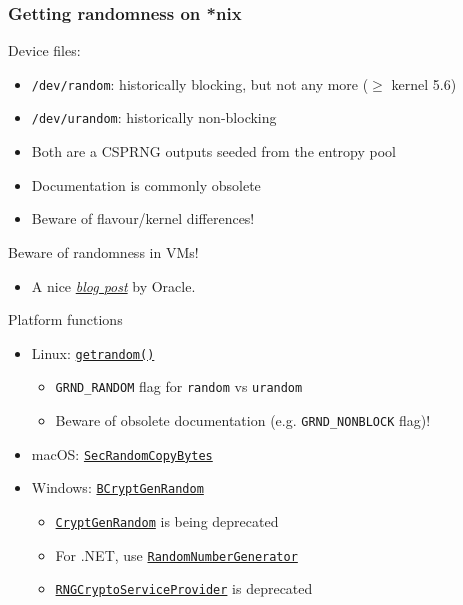 \begin{frame}
  \frametitle{Getting randomness on *nix}

  \pause
  Device files:
  \begin{itemize}
    \item \texttt{/dev/random}: historically blocking, but not any more ($\ge$ kernel 5.6)
    \item \texttt{/dev/urandom}: historically non-blocking
    \pause
    \item Both are a CSPRNG outputs seeded from the entropy pool
    \pause
    \item Documentation is commonly obsolete
    \pause
    \item Beware of flavour/kernel differences!
  \end{itemize}

  \vspace*{1em}
  
  \pause
  Beware of randomness in VMs!
  \begin{itemize}
    \item A nice \href{https://blogs.oracle.com/linux/post/rngd1}{\emph{blog post}} by Oracle.
  \end{itemize}
\end{frame}

\begin{frame}{Platform functions}
  \begin{itemize}[<+(1)->]
    \item Linux: \href{https://man7.org/linux/man-pages/man2/getrandom.2.html}{\texttt{getrandom()}}
    \begin{itemize}
      \item \texttt{GRND\_RANDOM} flag for \texttt{random} vs \texttt{urandom}
      \item Beware of obsolete documentation (e.g. \texttt{GRND\_NONBLOCK} flag)!
    \end{itemize}
    \vspace*{1em}
    \item macOS: \href{https://developer.apple.com/documentation/security/secrandomcopybytes(_:_:_:)}{\texttt{SecRandomCopyBytes}}
    \vspace*{1em}
    \item Windows: \href{https://learn.microsoft.com/en-us/windows/win32/api/bcrypt/nf-bcrypt-bcryptgenrandom}{\texttt{BCryptGenRandom}}
    \begin{itemize}
      \item \href{https://learn.microsoft.com/en-us/windows/win32/api/wincrypt/nf-wincrypt-cryptgenrandom}{\texttt{CryptGenRandom}} is being deprecated
      \item For .NET, use \href{https://learn.microsoft.com/en-us/dotnet/api/system.security.cryptography.randomnumbergenerator}{\texttt{RandomNumberGenerator}}
      \item \href{https://learn.microsoft.com/en-us/dotnet/api/system.security.cryptography.rngcryptoserviceprovider}{\texttt{RNGCryptoServiceProvider}} is deprecated
    \end{itemize}
  \end{itemize}
\end{frame}

